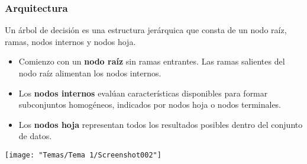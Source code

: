 \subsubsection{Arquitectura}
Un árbol de decisión es una estructura jerárquica que consta de un nodo raíz, ramas, nodos internos y nodos hoja.
\begin{itemize}
	\item Comienzo con un \textbf{nodo raíz} sin ramas entrantes. Las ramas salientes del nodo raíz alimentan los nodos internos.
	\item Los \textbf{nodos internos} evalúan características disponibles para formar subconjuntos homogéneos, indicados por nodos hoja o nodos terminales.
	\item Los \textbf{nodos hoja} representan todos los resultados posibles dentro del conjunto de datos.
\end{itemize}
\begin{center}
	\texttt{[image: "Temas/Tema 1/Screenshot002"]}
\end{center}
